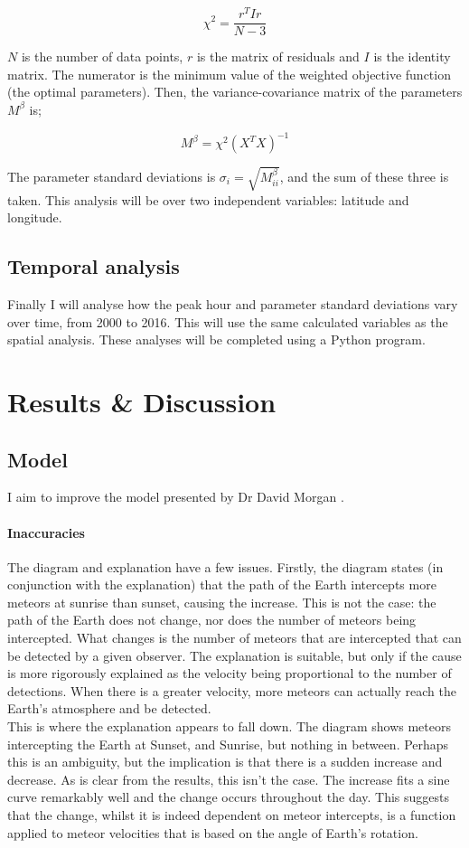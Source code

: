 \begin{equation}
\chi^2 = \frac{r^T I r}{N - 3}
\end{equation}

$N$ is the number of data points, $r$ is the matrix of 
residuals and $I$ is the identity matrix. The numerator is 
the minimum value of the weighted objective function (the 
optimal parameters). Then, the variance-covariance matrix 
of the parameters $M^{\beta}$ is;

\begin{equation} 
M^{\beta} = \chi^2 \left( X^T X \right)^{-1}
\end{equation}

The parameter standard deviations is $\sigma_i 
=\sqrt{M_{ii}^{\beta}}$, and the sum of these three is taken. 
This analysis will be over two independent variables: latitude and longitude. 
\subsection{Temporal analysis}
Finally I will analyse how the peak hour and parameter standard deviations vary over time, from 2000 to 2016. This will use the same calculated variables as the spatial analysis. These analyses will be completed using a Python program.

\section{Results \& Discussion}
\subsection{Model}
I aim to improve the model presented by Dr David Morgan \cite{baa}.
\paragraph{Inaccuracies\\}
The diagram and explanation have a few issues. Firstly, the diagram states (in conjunction with the explanation) that the path of the Earth intercepts more meteors at sunrise than sunset, causing the increase. This is not the case: the path of the Earth does not change, nor does the number of meteors being intercepted. What changes is the number of meteors that are intercepted that can be detected by a given observer. The explanation is suitable, but only if the cause is more rigorously explained as the velocity being proportional to the number of detections. When there is a greater velocity, more meteors can actually reach the Earth's atmosphere and be detected. \\
This is where the explanation appears to fall down. The diagram shows meteors intercepting the Earth at Sunset, and Sunrise, but nothing in between. Perhaps this is an ambiguity, but the implication is that there is a sudden increase and decrease. As is clear from the results, this isn't the case. The increase fits a sine curve remarkably well and the change occurs throughout the day. This suggests that the change, whilst it is indeed dependent on meteor intercepts, is a function applied to meteor velocities that is based on the angle of Earth's rotation. \\
